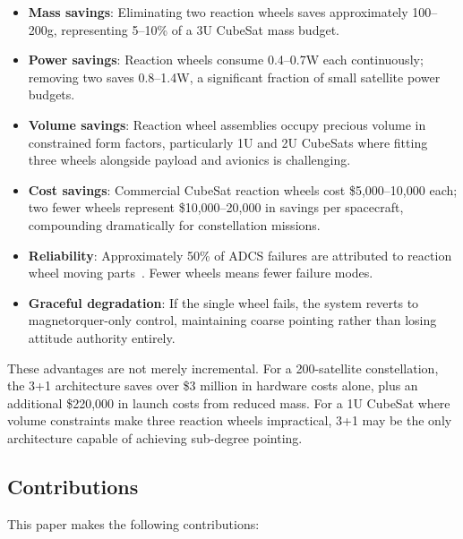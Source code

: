 \documentclass[9pt]{extarticle}
\begin{document}
\begin{itemize}
    \item \textbf{Mass savings}: Eliminating two reaction wheels saves approximately 100--200g, representing 5--10\% of a 3U CubeSat mass budget.

    \item \textbf{Power savings}: Reaction wheels consume 0.4--0.7W each continuously; removing two saves 0.8--1.4W, a significant fraction of small satellite power budgets.

    \item \textbf{Volume savings}: Reaction wheel assemblies occupy precious volume in constrained form factors, particularly 1U and 2U CubeSats where fitting three wheels alongside payload and avionics is challenging.

    \item \textbf{Cost savings}: Commercial CubeSat reaction wheels cost \$5,000--10,000 each; two fewer wheels represent \$10,000--20,000 in savings per spacecraft, compounding dramatically for constellation missions.

    \item \textbf{Reliability}: Approximately 50\% of ADCS failures are attributed to reaction wheel moving parts~\cite{langer2016cubesat}. Fewer wheels means fewer failure modes.

    \item \textbf{Graceful degradation}: If the single wheel fails, the system reverts to magnetorquer-only control, maintaining coarse pointing rather than losing attitude authority entirely.
\end{itemize}

These advantages are not merely incremental. For a 200-satellite constellation, the 3+1 architecture saves over \$3 million in hardware costs alone, plus an additional \$220,000 in launch costs from reduced mass. For a 1U CubeSat where volume constraints make three reaction wheels impractical, 3+1 may be the only architecture capable of achieving sub-degree pointing.

\subsection{Contributions}

This paper makes the following contributions:
\end{document}
